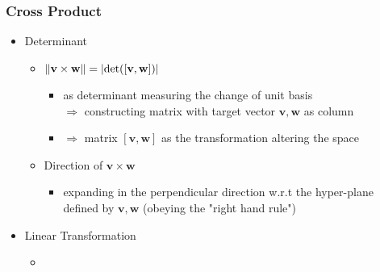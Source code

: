 \subsubsection{Cross Product}
\begin{itemize}
\item Determinant
	\begin{itemize}
	\item $\lVert\mathbf v \times \mathbf w\rVert = \lvert\det([\mathbf v,\mathbf w])\rvert$
		\begin{itemize}
		\item as determinant measuring the change of unit basis \\
		$\Rightarrow$ constructing matrix with target vector $\mathbf v, \mathbf w$ as column
		\item $\Rightarrow$ matrix $[\mathbf v,\mathbf w]$ as the transformation altering the space      
		\end{itemize}
	\item Direction of $\mathbf v\times\mathbf w$
		\begin{itemize}
		\item expanding in the perpendicular direction w.r.t the hyper-plane defined by $\mathbf v, \mathbf w$
		(obeying the "right hand rule")
		\end{itemize}
	\end{itemize}
\item Linear Transformation
	\begin{itemize}
	\item  
	\end{itemize}
\end{itemize}


